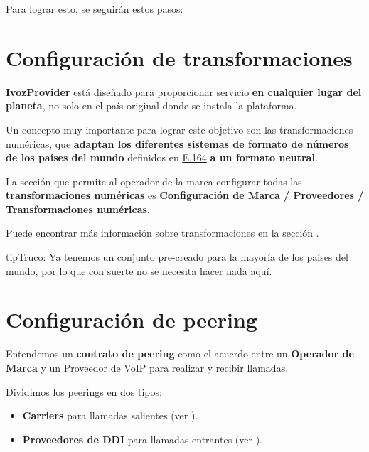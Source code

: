 \documentclass[letterpaper,10pt,spanish]{sphinxmanual}
\begin{document}
Para lograr esto, se seguirán estos pasos:


\section{Configuración de transformaciones}
\label{getting_started/external_incoming_calls/transformations:transformations-configuration}\label{getting_started/external_incoming_calls/transformations::doc}
\textbf{IvozProvider} está diseñado para proporcionar servicio \textbf{en cualquier lugar del planeta}, no solo en el país original donde se instala la plataforma.

Un concepto muy importante para lograr este objetivo son las transformaciones numéricas, que \textbf{adaptan los diferentes sistemas de formato de números de los países del mundo} definidos en \href{https://www.itu.int/rec/T-REC-E.164/es}{E.164} \textbf{a un formato neutral}.

La sección que permite al operador de la marca configurar todas las \textbf{transformaciones numéricas} es \textbf{Configuración de Marca / Proveedores / Transformaciones numéricas}.

Puede encontrar más información sobre transformaciones en la sección {\hyperref[administration_portal/brand/settings/numeric_transformations:numeric\string-transformations]{}}.

\begin{notice}{tip}{Truco:}
Ya tenemos un conjunto pre-creado para la mayoría de los países del mundo, por lo que con suerte no se necesita hacer nada aquí.
\end{notice}


\section{Configuración de peering}
\label{getting_started/external_incoming_calls/peering:peering-configuration}\label{getting_started/external_incoming_calls/peering::doc}
Entendemos un \textbf{contrato de peering} como el acuerdo entre un \textbf{Operador de Marca} y un Proveedor de VoIP para realizar y recibir llamadas.

Dividimos los peerings en dos tipos:
\begin{itemize}
\item {} 
\textbf{Carriers} para llamadas salientes (ver {\hyperref[administration_portal/brand/providers/carriers:carriers]{}}).

\item {} 
\textbf{Proveedores de DDI} para llamadas entrantes (ver {\hyperref[administration_portal/brand/providers/ddi_providers:ddi\string-providers]{}}).

\end{itemize}
\end{document}
